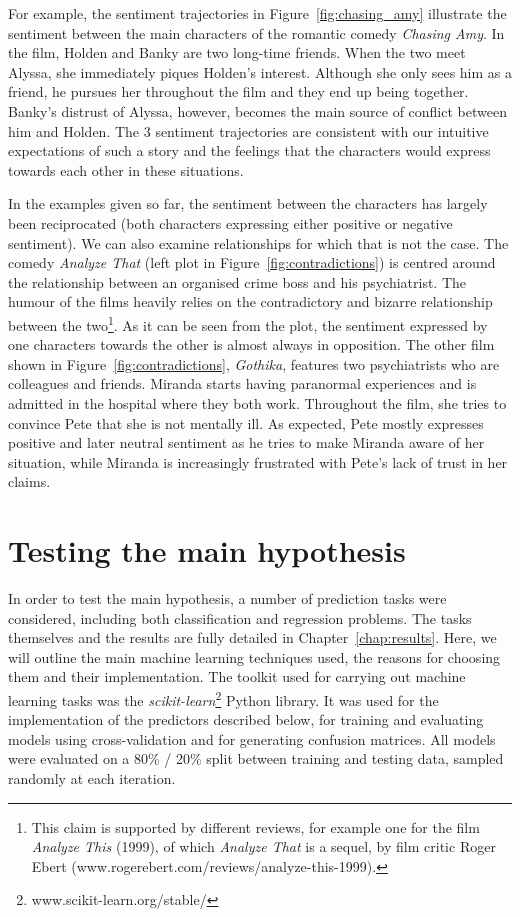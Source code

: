 \documentclass[bsc,frontabs,singlespacing,parskip, twoside]{infthesis}
\begin{document}
For example, the sentiment trajectories in Figure~\ref{fig:chasing_amy} illustrate the sentiment between the main characters of the romantic comedy \textit{Chasing Amy}. In the film, Holden and Banky are two long-time friends. When the two meet Alyssa, she immediately piques Holden's interest. Although she only sees him as a friend, he pursues her throughout the film and they end up being together. Banky's distrust of Alyssa, however, becomes the main source of conflict between him and Holden. The 3 sentiment trajectories are consistent with our intuitive expectations of such a story and the feelings that the characters would express towards each other in these situations.

In the examples given so far, the sentiment between the characters has largely been reciprocated (both characters expressing either positive or negative sentiment). We can also examine relationships for which that is not the case. The comedy \textit{Analyze That} (left plot in Figure~\ref{fig:contradictions}) is centred around the relationship between an organised crime boss and his psychiatrist. The humour of the films heavily relies on the contradictory and bizarre relationship between the two\footnote{This claim is supported by different reviews, for example one for the film \textit{Analyze This} (1999), of which \textit{Analyze That} is a sequel, by film critic Roger Ebert (www.rogerebert.com/reviews/analyze-this-1999).}. As it can be seen from the plot, the sentiment expressed by one characters towards the other is almost always in opposition. The other film shown in Figure~\ref{fig:contradictions}, \textit{Gothika}, features two psychiatrists who are colleagues and friends. Miranda starts having paranormal experiences and is admitted in the hospital where they both work. Throughout the film, she tries to convince Pete that she is not mentally ill. As expected, Pete mostly expresses positive and later neutral sentiment as he tries to make Miranda aware of her situation, while Miranda is increasingly frustrated with Pete's lack of trust in her claims.


\section{Testing the main hypothesis}
\label{sec:predictors}
In order to test the main hypothesis, a number of prediction tasks were considered, including both classification and regression problems. The tasks themselves and the results are fully detailed in Chapter~\ref{chap:results}. Here, we will outline the main machine learning techniques used, the reasons for choosing them and their implementation. The toolkit used for carrying out machine learning tasks was the \textit{scikit-learn}\footnote{www.scikit-learn.org/stable/} Python library. It was used for the implementation of the predictors described below, for training and evaluating models using cross-validation and for generating confusion matrices. All models were evaluated on a 80\% / 20\% split between training and testing data, sampled randomly at each iteration.
\end{document}
